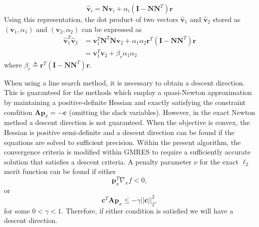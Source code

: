 \documentclass[12pt]{article}
\newcommand{\mb}{\mathbf}
\begin{document}
%
\begin{equation*}
  \hat{\mb{v}}_{i} = \mb{N}\mb{v}_{i} + \alpha_{i} (\mb{I} - \mb{N}\mb{N}^{T})\mb{r}
\end{equation*}
Using this representation, the dot product of two vectors $\hat{\mb{v}}_{1}$ and $\hat{\mb{v}}_{2}$ stored as $(\mb{v}_{1}, \alpha_{1})$ and $(\mb{v}_{2}, \alpha_{2})$ can be expressed as
%
\begin{equation*}
  \begin{aligned}
    \hat{\mb{v}}_{1}^{T}\hat{\mb{v}}_{2} & =
    \mb{v}_{1}^{T} \mb{N}^{T}\mb{N}\mb{v}_{2} +
    \alpha_{1}\alpha_{2} \mb{r}^{T} \left(\mb{I} - \mb{N} \mb{N}^{T}\right)\mb{r} \\
      &= \mb{v}_{1}^{T} \mb{v}_{2} + \beta_{r} \alpha_{1}\alpha_{2}
  \end{aligned}
\end{equation*}
where $\beta_{r} \triangleq \mb{r}^{T} \left(\mb{I} - \mb{N} \mb{N}^{T}\right)\mb{r}$.

When using a line search method, it is necessary to obtain a descent direction.
This is guaranteed for the methods which employ a quasi-Newton approximation by maintaining a positive-definite Hessian and exactly satisfying the constraint condition $\mb{A}\mb{p}_{x} = -\mb{c}$ (omitting the slack variables).
However, in the exact Newton method a descent direction is not guaranteed.
When the objective is convex, the Hessian is positive semi-definite and a descent direction can be found if the equations are solved to sufficient precision.
Within the present algorithm, the convergence criteria is modified within GMRES to require a sufficiently accurate solution that satisfies a descent criteria.
A penalty parameter $\nu$ for the exact $\ell_{2}$ merit function can be found if either
\begin{equation}
  \label{eqn:descent-function}
  \mb{p}_{x}^{T} \nabla_{x} f < 0,
\end{equation}
or
\begin{equation}
  \label{eqn:descent-constraint}
  \mb{c}^{T}\mb{A} \mb{p}_{x} \le - \gamma ||\mb{c}||_{2}^2,
\end{equation}
for some $0 < \gamma < 1$.
Therefore, if either condition is satisfied we will have a descent direction.
\end{document}
